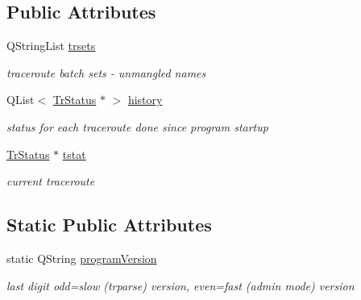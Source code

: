 \subsection*{Public Attributes}
\begin{CompactItemize}
\item 
\hypertarget{classTrDo_92f843277e1338717f5a4f3aff0e56aa}{
QStringList \hyperlink{classTrDo_92f843277e1338717f5a4f3aff0e56aa}{trsets}}
\label{classTrDo_92f843277e1338717f5a4f3aff0e56aa}

\begin{CompactList}\small\item\em traceroute batch sets - unmangled names \item\end{CompactList}\item 
\hypertarget{classTrDo_04ecbe0ec200411f90e066d3989c5e9b}{
QList$<$ \hyperlink{classTrStatus}{TrStatus} $\ast$ $>$ \hyperlink{classTrDo_04ecbe0ec200411f90e066d3989c5e9b}{history}}
\label{classTrDo_04ecbe0ec200411f90e066d3989c5e9b}

\begin{CompactList}\small\item\em status for each traceroute done since program startup \item\end{CompactList}\item 
\hypertarget{classTrDo_b1912812526c5f6f6bd3105e80e1954c}{
\hyperlink{classTrStatus}{TrStatus} $\ast$ \hyperlink{classTrDo_b1912812526c5f6f6bd3105e80e1954c}{tstat}}
\label{classTrDo_b1912812526c5f6f6bd3105e80e1954c}

\begin{CompactList}\small\item\em current traceroute \item\end{CompactList}\end{CompactItemize}
\subsection*{Static Public Attributes}
\begin{CompactItemize}
\item 
\hypertarget{classTrDo_4cf4ffad541f977b5d91e7e03cddb52b}{
static QString \hyperlink{classTrDo_4cf4ffad541f977b5d91e7e03cddb52b}{programVersion}}
\label{classTrDo_4cf4ffad541f977b5d91e7e03cddb52b}

\begin{CompactList}\small\item\em last digit odd=slow (trparse) version, even=fast (admin mode) version \item\end{CompactList}\end{CompactItemize}
